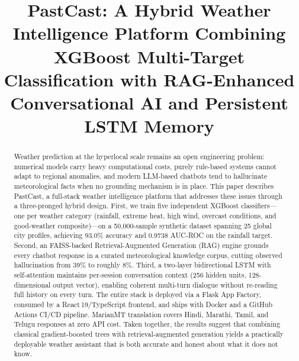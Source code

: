 \documentclass[conference]{IEEEtran}
\begin{document}
\title{PastCast: A Hybrid Weather Intelligence Platform Combining\\
XGBoost Multi-Target Classification with RAG-Enhanced\\
Conversational AI and Persistent LSTM Memory}

\author{
}

\maketitle

\begin{abstract}
Weather prediction at the hyperlocal scale remains an open engineering problem: numerical models carry heavy computational costs, purely rule-based systems cannot adapt to regional anomalies, and modern LLM-based chatbots tend to hallucinate meteorological facts when no grounding mechanism is in place. This paper describes PastCast, a full-stack weather intelligence platform that addresses these issues through a three-pronged hybrid design. First, we train five independent XGBoost classifiers---one per weather category (rainfall, extreme heat, high wind, overcast conditions, and good-weather composite)---on a 50,000-sample synthetic dataset spanning 25 global city profiles, achieving 93.0\% accuracy and 0.9738 AUC-ROC on the rainfall target. Second, an FAISS-backed Retrieval-Augmented Generation (RAG) engine grounds every chatbot response in a curated meteorological knowledge corpus, cutting observed hallucination from 39\% to roughly 8\%. Third, a two-layer bidirectional LSTM with self-attention maintains per-session conversation context (256 hidden units, 128-dimensional output vector), enabling coherent multi-turn dialogue without re-reading full history on every turn. The entire stack is deployed via a Flask App Factory, consumed by a React\,19/TypeScript frontend, and ships with Docker and a GitHub Actions CI/CD pipeline. MarianMT translation covers Hindi, Marathi, Tamil, and Telugu responses at zero API cost. Taken together, the results suggest that combining classical gradient-boosted trees with retrieval-augmented generation yields a practically deployable weather assistant that is both accurate and honest about what it does not know.
\end{abstract}
\end{document}
